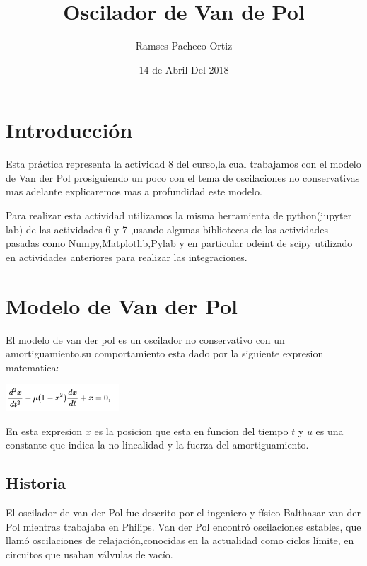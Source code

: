 \documentclass{article}
\begin{document}
\title{Oscilador de Van de Pol}
\author{Ramses Pacheco Ortiz}
\date{14 de Abril Del 2018}
\maketitle  


\section{Introducción}
Esta práctica representa la actividad 8 del curso,la cual trabajamos con el modelo de Van der Pol prosiguiendo un poco con el tema de oscilaciones no conservativas mas adelante explicaremos mas a profundidad este modelo.

\vspace{0.1cm}
Para realizar esta actividad utilizamos la misma herramienta de python(jupyter lab) de las actividades 6 y 7 ,usando algunas bibliotecas de las actividades pasadas como Numpy,Matplotlib,Pylab y en particular odeint de scipy utilizado en actividades anteriores para realizar las integraciones.


\section{Modelo de Van der Pol}

El modelo de van der pol es un oscilador no conservativo con un amortiguamiento,su comportamiento esta dado por la siguiente expresion matematica:

\begin{center}
\includegraphics[height=1cm]{fig1.png}
\end{center}

En esta expresion $x$ es la posicion que esta en funcion del tiempo $t$  y $u$ es una constante que indica la no linealidad y la fuerza del amortiguamiento.

\subsection{Historia}

El oscilador de van der Pol fue descrito por el ingeniero y físico Balthasar van der Pol mientras trabajaba en Philips. Van der Pol encontró oscilaciones estables, que llamó oscilaciones de relajación,conocidas en la actualidad como ciclos límite, en circuitos que usaban válvulas de vacío. 
\end{document}
